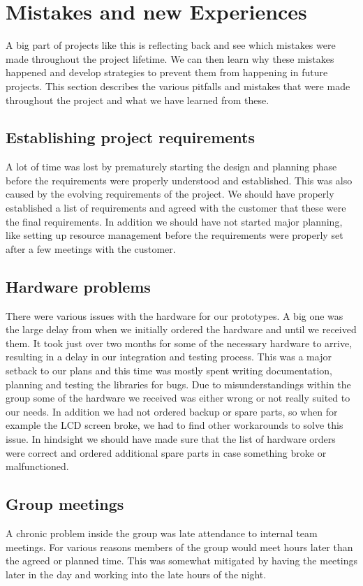 \section{Mistakes and new Experiences}
A big part of projects like this is reflecting back and see which mistakes were made throughout
the project lifetime. We can then learn why these mistakes happened and develop strategies to
prevent them from happening in future projects. This section describes the various pitfalls and
mistakes that were made throughout the project and what we have learned from these.

\subsection{Establishing project requirements}
A lot of time was lost by prematurely starting the design and planning phase before the
requirements were properly understood and established. This was also caused by the evolving
requirements of the project. We should have properly established a list of
requirements and agreed with the customer that these were the final requirements. In addition we
should have not started major planning, like setting up resource management before the requirements
were properly set after a few meetings with the customer.

\subsection{Hardware problems}
There were various issues with the hardware for our prototypes. A big one was the large delay
from when we initially ordered the hardware and until we received them. It took just over two months for
some of the necessary hardware to arrive, resulting in a delay in our integration and testing process.
This was a major setback to our plans and this time was mostly spent writing documentation, planning
and testing the libraries for bugs. Due to misunderstandings within the group some of the
hardware we received was either wrong or not really suited to our needs. In addition we had
not ordered backup or spare parts, so when for example the LCD screen broke, we had to find other 
workarounds to solve this issue. In hindsight we should have made sure that the list of hardware orders 
were correct and ordered additional spare parts in case something broke or malfunctioned.

\subsection{Group meetings}
A chronic problem inside the group was late attendance to internal team meetings. For various reasons members of
the group would meet hours later than the agreed or planned time. This was somewhat mitigated by having 
the meetings later in the day and working into the late hours of the night.

